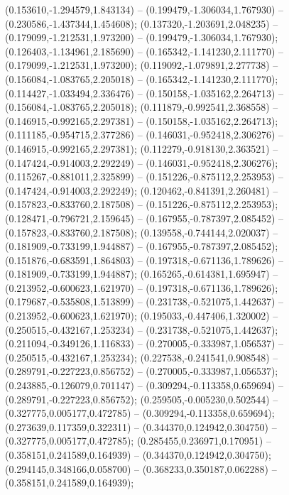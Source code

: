 (0.153610,-1.294579,1.843134) -- (0.199479,-1.306034,1.767930) -- (0.230586,-1.437344,1.454608);
 (0.137320,-1.203691,2.048235) -- (0.179099,-1.212531,1.973200) -- (0.199479,-1.306034,1.767930);
 (0.126403,-1.134961,2.185690) -- (0.165342,-1.141230,2.111770) -- (0.179099,-1.212531,1.973200);
 (0.119092,-1.079891,2.277738) -- (0.156084,-1.083765,2.205018) -- (0.165342,-1.141230,2.111770);
 (0.114427,-1.033494,2.336476) -- (0.150158,-1.035162,2.264713) -- (0.156084,-1.083765,2.205018);
 (0.111879,-0.992541,2.368558) -- (0.146915,-0.992165,2.297381) -- (0.150158,-1.035162,2.264713);
 (0.111185,-0.954715,2.377286) -- (0.146031,-0.952418,2.306276) -- (0.146915,-0.992165,2.297381);
 (0.112279,-0.918130,2.363521) -- (0.147424,-0.914003,2.292249) -- (0.146031,-0.952418,2.306276);
 (0.115267,-0.881011,2.325899) -- (0.151226,-0.875112,2.253953) -- (0.147424,-0.914003,2.292249);
 (0.120462,-0.841391,2.260481) -- (0.157823,-0.833760,2.187508) -- (0.151226,-0.875112,2.253953);
 (0.128471,-0.796721,2.159645) -- (0.167955,-0.787397,2.085452) -- (0.157823,-0.833760,2.187508);
 (0.139558,-0.744144,2.020037) -- (0.181909,-0.733199,1.944887) -- (0.167955,-0.787397,2.085452);
 (0.151876,-0.683591,1.864803) -- (0.197318,-0.671136,1.789626) -- (0.181909,-0.733199,1.944887);
 (0.165265,-0.614381,1.695947) -- (0.213952,-0.600623,1.621970) -- (0.197318,-0.671136,1.789626);
 (0.179687,-0.535808,1.513899) -- (0.231738,-0.521075,1.442637) -- (0.213952,-0.600623,1.621970);
 (0.195033,-0.447406,1.320002) -- (0.250515,-0.432167,1.253234) -- (0.231738,-0.521075,1.442637);
 (0.211094,-0.349126,1.116833) -- (0.270005,-0.333987,1.056537) -- (0.250515,-0.432167,1.253234);
 (0.227538,-0.241541,0.908548) -- (0.289791,-0.227223,0.856752) -- (0.270005,-0.333987,1.056537);
 (0.243885,-0.126079,0.701147) -- (0.309294,-0.113358,0.659694) -- (0.289791,-0.227223,0.856752);
 (0.259505,-0.005230,0.502544) -- (0.327775,0.005177,0.472785) -- (0.309294,-0.113358,0.659694);
 (0.273639,0.117359,0.322311) -- (0.344370,0.124942,0.304750) -- (0.327775,0.005177,0.472785);
 (0.285455,0.236971,0.170951) -- (0.358151,0.241589,0.164939) -- (0.344370,0.124942,0.304750);
 (0.294145,0.348166,0.058700) -- (0.368233,0.350187,0.062288) -- (0.358151,0.241589,0.164939);
